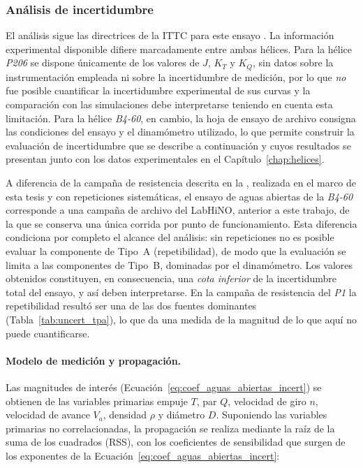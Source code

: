 \subsubsection{Análisis de incertidumbre}
\label{sec:analisis_incertidumbre_aguas_abiertas}

El análisis sigue las directrices de la ITTC para este ensayo \citep{ITTC_uncertainty_OW}. La información experimental disponible difiere marcadamente entre ambas hélices. Para la hélice \textit{P206} se dispone únicamente de los valores de $J$, $K_T$ y $K_Q$, sin datos sobre la instrumentación empleada ni sobre la incertidumbre de medición, por lo que \emph{no} fue posible cuantificar la incertidumbre experimental de sus curvas y la comparación con las simulaciones debe interpretarse teniendo en cuenta esta limitación. Para la hélice \textit{B4-60}, en cambio, la hoja de ensayo de archivo consigna las condiciones del ensayo y el dinamómetro utilizado, lo que permite construir la evaluación de incertidumbre que se describe a continuación y cuyos resultados se presentan junto con los datos experimentales en el Capítulo~\ref{chap:helices}.

A diferencia de la campaña de resistencia descrita en la , realizada en el marco de esta tesis y con repeticiones sistemáticas, el ensayo de aguas abiertas de la \textit{B4-60} corresponde a una campaña de archivo del LabHiNO, anterior a este trabajo, de la que se conserva una única corrida por punto de funcionamiento. Esta diferencia condiciona por completo el alcance del análisis: sin repeticiones no es posible evaluar la componente de Tipo~A (repetibilidad), de modo que la evaluación se limita a las componentes de Tipo~B, dominadas por el dinamómetro. Los valores obtenidos constituyen, en consecuencia, una \emph{cota inferior} de la incertidumbre total del ensayo, y así deben interpretarse. En la campaña de resistencia del \textit{P1} la repetibilidad resultó ser una de las dos fuentes dominantes (Tabla~\ref{tab:uncert_tpa}), lo que da una medida de la magnitud de lo que aquí no puede cuantificarse.

\paragraph{Modelo de medición y propagación.}

Las magnitudes de interés (Ecuación~\ref{eq:coef_aguas_abiertas_incert}) se obtienen de las variables primarias empuje $T$, par $Q$, velocidad de giro $n$, velocidad de avance $V_a$, densidad $\rho$ y diámetro $D$. Suponiendo las variables primarias no correlacionadas, la propagación se realiza mediante la raíz de la suma de los cuadrados (RSS), con los coeficientes de sensibilidad que surgen de los exponentes de la Ecuación~\ref{eq:coef_aguas_abiertas_incert}:

